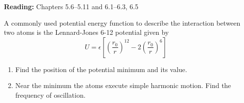 \documentclass[12pt,letterpaper]{hmcpset}
\begin{document}

\noindent
\textbf{Reading:} Chapters 5.6--5.11 and 6.1--6.3, 6.5

\begin{problem}
  A commonly used potential energy function to describe the interaction between
  two atoms is the Lennard-Jones 6-12 potential given by
  \begin{equation*}
	U = \epsilon \left[ 
      \left( \frac{r_{0}}{r} \right)^{12} - 2 \left( \frac{r_{0}}{r} \right)^{6}
    \right]
  \end{equation*}
  \begin{enumerate}
    \item Find the position of the potential minimum and its value.
    \item Near the minimum the atoms execute simple harmonic motion. Find the
      frequency of oscillation.
  \end{enumerate}
\end{problem}

\begin{solution}
    \vfill
\end{solution}
\clearpage
\end{document}
